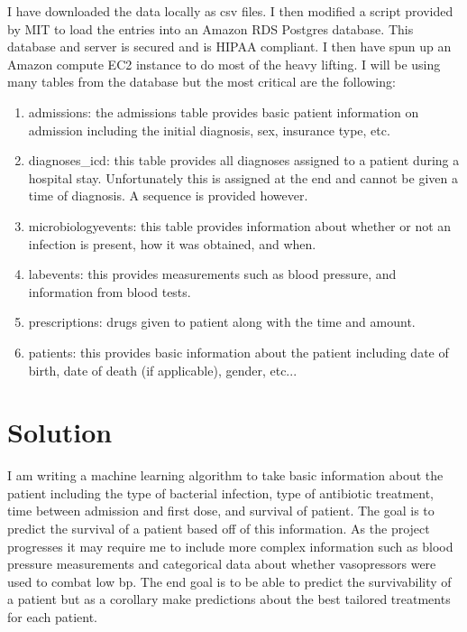 \documentclass[11pt]{article}
\begin{document}
I have downloaded the data locally as csv files. I then modified a script provided by MIT to load the entries into an Amazon RDS Postgres database. This database and server is secured and is HIPAA compliant. I then have spun up an Amazon compute EC2 instance to do most of the heavy lifting. I will be using many tables from the database but the most critical are the following:
\begin{enumerate}
\item admissions: the admissions table provides basic patient information on admission including the initial diagnosis, sex, insurance type, etc.
\item diagnoses\_icd: this table provides all diagnoses assigned to a patient during a hospital stay. Unfortunately this is assigned at the end and cannot be given a time of diagnosis. A sequence is provided however.
\item microbiologyevents: this table provides information about whether or not an infection is present, how it was obtained, and when.
\item labevents: this provides measurements such as blood pressure, and information from blood tests.
\item prescriptions: drugs given to patient along with the time and amount.
\item patients: this provides basic information about the patient including date of birth, date of death (if applicable), gender, etc...
\end{enumerate}


\section{Solution}
I am writing a machine learning algorithm to take basic information about the patient including the type of bacterial infection, type of antibiotic treatment, time between admission and first dose, and survival of patient. The goal is to predict the survival of a patient based off of this information. As the project progresses it may require me to include more complex information such as blood pressure measurements and categorical data about whether vasopressors were used to combat low bp. 
The end goal is to be able to predict the survivability of a patient but as a corollary make predictions about the best tailored treatments for each patient.

{}

\end{document}
